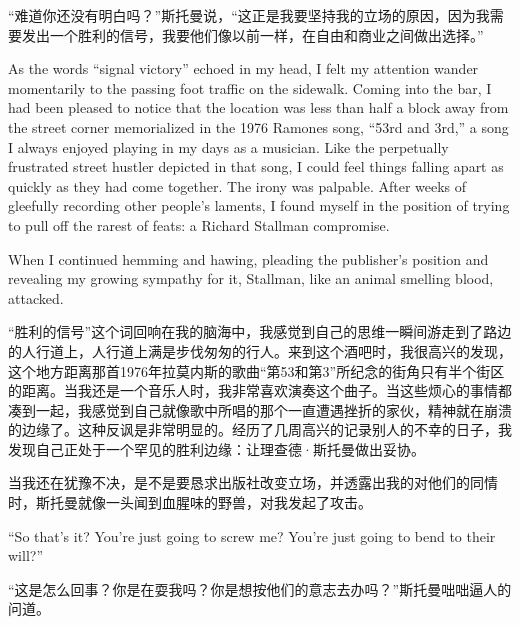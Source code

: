 \ifdefined\chs
``难道你还没有明白吗？''斯托曼说，``这正是我要坚持我的立场的原因，因为我需要发出一个胜利的信号，我要他们像以前一样，在自由和商业之间做出选择。''
\fi

\ifdefined\eng
As the words ``signal victory'' echoed in my head, I felt my attention wander momentarily to the passing foot traffic on the sidewalk. Coming into the bar, I had been pleased to notice that the location was less than half a block away from the street corner memorialized in the 1976 Ramones song, ``53rd and 3rd,'' a song I always enjoyed playing in my days as a musician. Like the perpetually frustrated street hustler depicted in that song, I could feel things falling apart as quickly as they had come together. The irony was palpable. After weeks of gleefully recording other people's laments, I found myself in the position of trying to pull off the rarest of feats: a Richard Stallman compromise. 

When I continued hemming and hawing, pleading the publisher's position and revealing my growing sympathy for it, Stallman, like an animal smelling blood, attacked. 
\fi

\ifdefined\chs
``胜利的信号''这个词回响在我的脑海中，我感觉到自己的思维一瞬间游走到了路边的人行道上，人行道上满是步伐匆匆的行人。来到这个酒吧时，我很高兴的发现，这个地方距离那首1976年拉莫内斯的歌曲``第53和第3''所纪念的街角只有半个街区的距离。当我还是一个音乐人时，我非常喜欢演奏这个曲子。当这些烦心的事情都凑到一起，我感觉到自己就像歌中所唱的那个一直遭遇挫折的家伙，精神就在崩溃的边缘了。这种反讽是非常明显的。经历了几周高兴的记录别人的不幸的日子，我发现自己正处于一个罕见的胜利边缘：让理查德·斯托曼做出妥协。

当我还在犹豫不决，是不是要恳求出版社改变立场，并透露出我的对他们的同情时，斯托曼就像一头闻到血腥味的野兽，对我发起了攻击。
\fi

\ifdefined\eng
``So that's it? You're just going to screw me? You're just going to bend to their will?''
\fi

\ifdefined\chs
``这是怎么回事？你是在耍我吗？你是想按他们的意志去办吗？''斯托曼咄咄逼人的问道。
\fi


